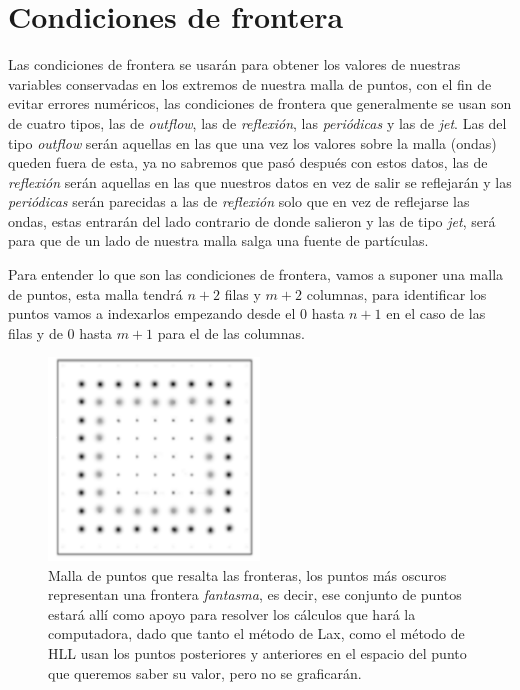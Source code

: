 \documentclass[12pt,a4paper]{book}
\begin{document}
\chapter{Condiciones de frontera} \label{aped.B}
Las condiciones de frontera se usarán para obtener los valores de nuestras variables conservadas en los extremos de nuestra malla de puntos, con el fin de evitar errores numéricos, las condiciones de frontera que 
generalmente se usan son de cuatro tipos, las de \textit{outflow}, las de \textit{reflexión}, las \textit{periódicas} y las de \textit{jet}. Las del tipo \textit{outflow} serán aquellas en las que una vez los valores 
sobre la malla (ondas) queden fuera de esta, ya no sabremos que pasó después con estos datos, las de \textit{reflexión} serán aquellas en las que nuestros datos en vez de salir se reflejarán y las \textit{periódicas} 
serán parecidas a las de \textit{reflexión} solo que en vez de reflejarse las ondas, estas entrarán del lado contrario de donde salieron  y las de tipo \textit{jet}, será para que de un lado de nuestra malla salga una 
fuente de partículas.

Para entender lo que son las condiciones de frontera, vamos a suponer una malla de puntos, esta malla tendrá $n+2$ filas y $m+2$ columnas, para identificar los puntos vamos a indexarlos empezando desde el 0 hasta 
$n+1$ en el caso de las filas y de 0 hasta $m+1$ para el de las columnas.

\begin{figure}[H]
\centering
\includegraphics[width=0.5\textwidth]{./Figuras/malla.png}
\caption{Malla de puntos que resalta las fronteras, los puntos más oscuros representan una frontera \emph{fantasma}, es decir, ese conjunto de puntos estará allí como apoyo para resolver los cálculos que hará 
la computadora, dado que tanto el método de Lax, como el método de HLL usan los puntos posteriores y anteriores en el espacio del punto que queremos saber su valor, pero no se graficarán.} \label{fig: malla de puntos}
\end{figure}
\end{document}
